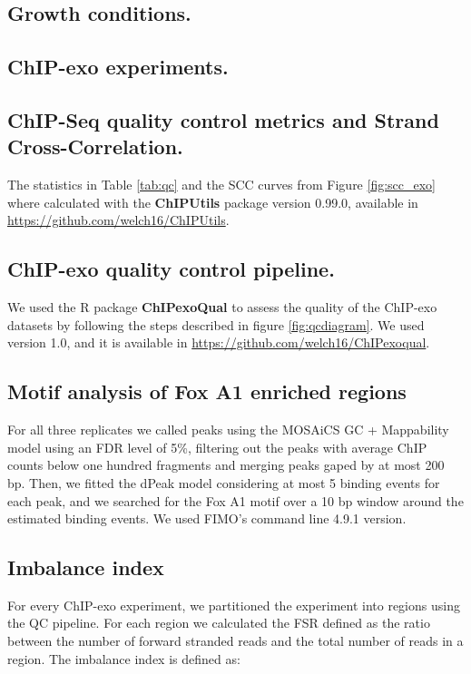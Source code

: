 \documentclass{bmcart}\usepackage[]{graphicx}\usepackage[]{color}
\begin{document}
\subsection*{Growth conditions.}

\subsection*{ChIP-exo experiments.}

\subsection*{ChIP-Seq quality control metrics and Strand
  Cross-Correlation.}

The statistics in Table \ref{tab:qc} and the SCC curves from Figure
\ref{fig:scc_exo} where calculated with the \textbf{ChIPUtils} package
version 0.99.0, available in
\url{https://github.com/welch16/ChIPUtils}.


\subsection*{ChIP-exo quality control pipeline.}

We used the R package \textbf{ChIPexoQual} to assess the quality of
the ChIP-exo datasets by following the steps described in figure
\ref{fig:qcdiagram}. We used version 1.0, and it is available in
\url{https://github.com/welch16/ChIPexoqual}.

\subsection*{Motif analysis of Fox A1 enriched regions}

For all three replicates we called peaks using the MOSAiCS GC +
Mappability model using an FDR level of 5\%, filtering out the peaks
with average ChIP counts below one hundred fragments and merging peaks
gaped by at most 200 bp. Then, we fitted the dPeak model considering
at most 5 binding events for each peak, and we searched for the Fox A1
motif over a 10 bp window around the estimated binding events. We used
FIMO's command line 4.9.1 version.

\subsection*{Imbalance index}

For every ChIP-exo experiment, we partitioned the experiment into
regions using the QC pipeline. For each region we calculated the FSR
defined as the ratio between the number of forward stranded reads and
the total number of reads in a region. The imbalance index is defined
as:
\end{document}
